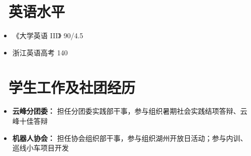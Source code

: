 \documentclass[11pt]{article}
\begin{document}
\section{\makebox[\widthof{\faGraduationCap}][c]{\color{CVBlue}\faList}\ 英语水平}
\begin{itemize}
    \item 《大学英语 III》 90/4.5
    \item 浙江英语高考 140
    
\end{itemize}
    
\section{\makebox[\widthof{\faInfo}][c]{\color{CVBlue}\faInfo}\ 学生工作及社团经历}
\begin{itemize}[parsep=0.5ex]
    \item \textbf{云峰分团委：} 担任分团委实践部干事，参与组织暑期社会实践结项答辩、云峰十佳答辩
    \item \textbf{机器人协会：} 担任协会组织部干事，参与组织湖州开放日活动；参与内训、巡线小车项目开发
\end{itemize}
\end{document}
